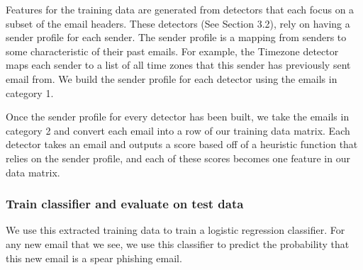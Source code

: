 Features for the training data are generated from detectors that each focus on a subset of the email headers. These detectors (See Section 3.2), rely on having a sender profile for each sender. The sender profile is a mapping from senders to some characteristic of their past emails. For example, the Timezone detector maps each sender to a list of all time zones that this sender has previously sent email from. We build the sender profile for each detector using the emails in category 1.

Once the sender profile for every detector has been built, we take the emails in category 2 and convert each email into a row of our training data matrix. Each detector takes an email and outputs a score based off of a heuristic function that relies on the sender profile, and each of these scores becomes one feature in our data matrix.

\subsubsection{Train classifier and evaluate on test data}
We use this extracted training data to train a logistic regression classifier. For any new email that we see, we use this classifier to predict the probability that this new email is a spear phishing email.